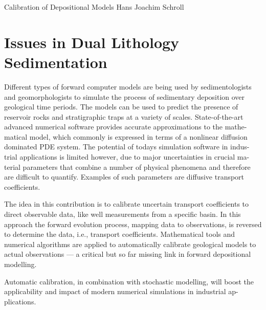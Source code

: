               {Calibration of Depositional Models}
              {Hans Joachim Schroll}

\editornote{[schroll]}

\section{Issues in Dual Lithology Sedimentation}

Different types of forward computer models are being used by
sedimentologists and geomorphologists to simulate the process of
sedimentary deposition over geological time periods. The models can be
used to predict the presence of reservoir rocks and stratigraphic
traps at a variety of scales. State-of-the-art advanced numerical
software provides accurate approximations to the mathe- matical model,
which commonly is expressed in terms of a nonlinear diffusion
dominated PDE system. The potential of todays simulation software in
indus- trial applications is limited however, due to major
uncertainties in crucial ma- terial parameters that combine a number
of physical phenomena and therefore are difficult to
quantify. Examples of such parameters are diffusive transport
coefficients.

The idea in this contribution is to calibrate uncertain transport
coefficients to direct observable data, like well measurements from a
specific basin. In this approach the forward evolution process,
mapping data to observations, is reversed to determine the data, i.e.,
transport coefficients. Mathematical tools and numerical algorithms
are applied to automatically calibrate geological models to actual
observations --- a critical but so far missing link in forward
depositional modelling.

Automatic calibration, in combination with stochastic modelling, will
boost the applicability and impact of modern numerical simulations in
industrial ap- plications.
